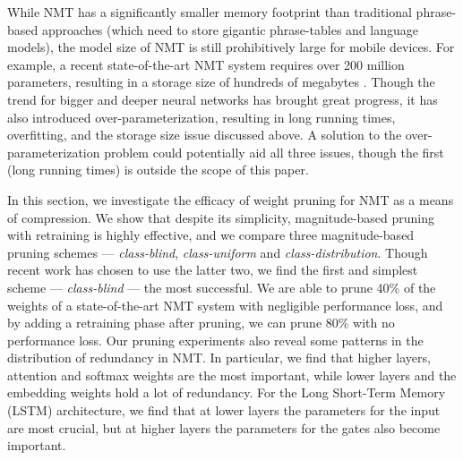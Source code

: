


While NMT has a significantly smaller memory footprint than traditional phrase-based approaches (which need to store gigantic phrase-tables and
language models), the model size of NMT is still prohibitively large for mobile devices.
For example, a recent state-of-the-art NMT system requires over 200 million
parameters, resulting in a storage size of hundreds of megabytes
\cite{luong15attn}. 
Though the trend for bigger and deeper neural networks has brought great progress, it has also introduced over-parameterization, resulting in long running times, overfitting, and the storage size issue discussed above. 
A solution to the over-parameterization problem could potentially aid all three issues, though the first (long running times) is outside the scope of this paper.

In this section, we investigate the efficacy of weight pruning for NMT as a means of compression.
We show that despite its simplicity, magnitude-based pruning with retraining is highly effective, and we compare three magnitude-based pruning schemes --- \textit{class-blind}, \textit{class-uniform} and \textit{class-distribution}.
Though recent work has chosen to use the latter two, we find the first and simplest scheme --- \textit{class-blind} --- the most successful.
We are able to prune 40\% of the weights of a state-of-the-art NMT system with negligible performance loss, and by adding a retraining phase after pruning, we can prune 80\% with no performance loss.
Our pruning experiments also reveal some patterns in the distribution of
redundancy in NMT. In particular, we find that higher layers, attention and softmax weights are the most important, while lower layers and the embedding weights hold a lot of redundancy. 
For the Long Short-Term Memory (LSTM) architecture, we find that at lower layers the parameters for the input are most crucial, but at higher layers the parameters for the gates also become important.
